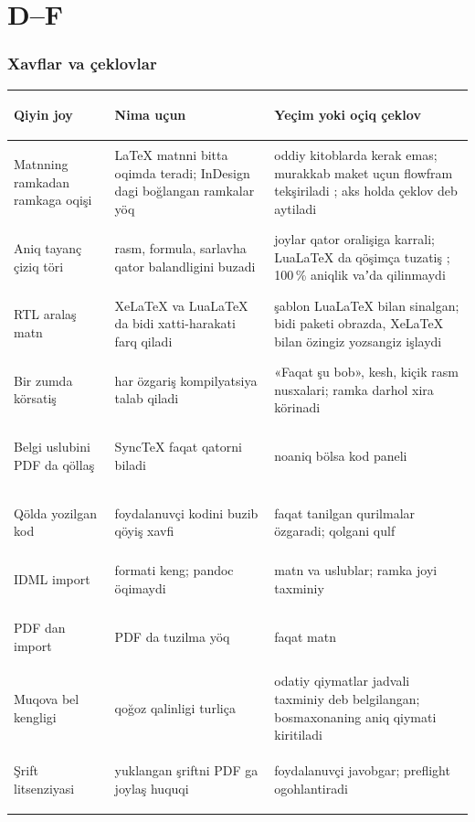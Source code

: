 \documentclass[11pt]{article}
\newcommand\tekshir[1]{\leavevmode{\color{qizil}\small[TEKSHIRILSIN: #1]}}
\begin{document}
\part*{D--F}
\section{Xavflar va çeklovlar}\label{sec:sd-xavf}
\begin{center}\footnotesize
\begin{tabularx}{\linewidth}{>{\bfseries\raggedright\arraybackslash}p{36mm}XX}
\toprule
Qiyin joy & Nima uçun & Yeçim yoki oçiq çeklov\\
\midrule
Matnning ramkadan ramkaga oqişi & LaTeX matnni bitta oqimda teradi; InDesign dagi boğlangan ramkalar yöq & oddiy kitoblarda kerak emas; murakkab maket uçun flowfram tekşiriladi \tekshir{flowfram ni sinab köriş}; aks holda çeklov deb aytiladi\\
Aniq tayanç çiziq töri & rasm, formula, sarlavha qator balandligini buzadi & joylar qator oralişiga karrali; LuaLaTeX da qöşimça tuzatiş \tekshir{}; 100\,\% aniqlik vaʼda qilinmaydi\\
RTL aralaş matn & XeLaTeX va LuaLaTeX da bidi xatti-harakati farq qiladi & şablon LuaLaTeX bilan sinalgan; bidi paketi obrazda, XeLaTeX bilan özingiz yozsangiz işlaydi\\
Bir zumda körsatiş & har özgariş kompilyatsiya talab qiladi & «Faqat şu bob», kesh, kiçik rasm nusxalari; ramka darhol xira körinadi\\
Belgi uslubini PDF da qöllaş & SyncTeX faqat qatorni biladi & noaniq bölsa kod paneli\\
Qölda yozilgan kod & foydalanuvçi kodini buzib qöyiş xavfi & faqat tanilgan qurilmalar özgaradi; qolgani qulf\\
IDML import & formati keng; pandoc öqimaydi & matn va uslublar; ramka joyi taxminiy\\
PDF dan import & PDF da tuzilma yöq & faqat matn\\
Muqova bel kengligi & qoğoz qalinligi turliça & odatiy qiymatlar jadvali taxminiy deb belgilangan; bosmaxonaning aniq qiymati kiritiladi\\
Şrift litsenziyasi & yuklangan şriftni PDF ga joylaş huquqi & foydalanuvçi javobgar; preflight ogohlantiradi \tekshir{matni}\\
\bottomrule
\end{tabularx}
\end{center}
\end{document}
